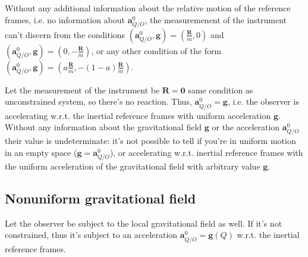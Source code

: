 \documentclass[letterpaper,10pt,english]{jupyterBook}
\begin{document}
\sphinxAtStartPar
Without any additional information about the relative motion of the reference frames, i.e. no information about \(\mathbf{a}_{Q/O}^0\), the measuremenent of the instrument can’t discern from the conditions \(( \mathbf{a}^0_{Q/O}, \mathbf{g} ) = \left( \tfrac{\mathbf{R}}{m}, 0 \right)\) and \(( \mathbf{a}^0_{Q/O}, \mathbf{g} ) = \left( 0, - \tfrac{\mathbf{R}}{m} \right)\), or any other condition of the form  \(( \mathbf{a}^0_{Q/O}, \mathbf{g} ) = \left( a \tfrac{\mathbf{R}}{m}, - ( 1 - a ) \tfrac{\mathbf{R}}{m} \right)\).

\sphinxAtStartPar
{} Let the measurement of the instrument be \(\mathbf{R} = \mathbf{0}\) \sphinxhyphen{} same condition as unconstrained system, so there’s no reaction. Thus, \(\mathbf{a}^0_{Q/O} = \mathbf{g}\), i.e. the observer is accelerating w.r.t. the inertial reference frames with uniform acceleration \(\mathbf{g}\). Without any information about the gravitational field \(\mathbf{g}\) or the acceleration \(\mathbf{a}^0_{Q/O}\) their value is undeterminate: it’s not possible to tell if you’re in uniform motion in an empty space (\(\mathbf{g} = \mathbf{a}^0_{Q/O}\)), or accelerating w.r.t. inertial reference frames with the uniform acceleration of the gravitational field with arbitrary value \(\mathbf{g}\).


\subsection{Non\sphinxhyphen{}uniform gravitational field}
\label{\detokenize{ch/dynamics-equivalence-principle:non-uniform-gravitational-field}}\label{\detokenize{ch/dynamics-equivalence-principle:classical-mechanics-dynamics-equivalence-principle-non-uniform}}
\sphinxAtStartPar
Let the observer be subject to the local gravitational field as well. If it’s not constrained, thus it’s subject to an acceleration \(\mathbf{a}_{Q/O}^0 = \mathbf{g}\left( Q \right)\) w.r.t. the inertial reference frames.
\end{document}
